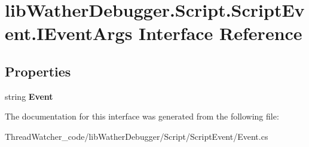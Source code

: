 \hypertarget{interfacelib_wather_debugger_1_1_script_1_1_script_event_1_1_i_event_args}{\section{lib\+Wather\+Debugger.\+Script.\+Script\+Event.\+I\+Event\+Args Interface Reference}
\label{interfacelib_wather_debugger_1_1_script_1_1_script_event_1_1_i_event_args}
}
\subsection*{Properties}
\begin{DoxyCompactItemize}
\item 
\hypertarget{interfacelib_wather_debugger_1_1_script_1_1_script_event_1_1_i_event_args_ab32504bc1e5395f307c11317913299ae}{string {\bfseries Event}}\label{interfacelib_wather_debugger_1_1_script_1_1_script_event_1_1_i_event_args_ab32504bc1e5395f307c11317913299ae}

\end{DoxyCompactItemize}


The documentation for this interface was generated from the following file\+:\begin{DoxyCompactItemize}
\item 
Thread\+Watcher\+\_\+code/lib\+Wather\+Debugger/\+Script/\+Script\+Event/Event.\+cs\end{DoxyCompactItemize}
